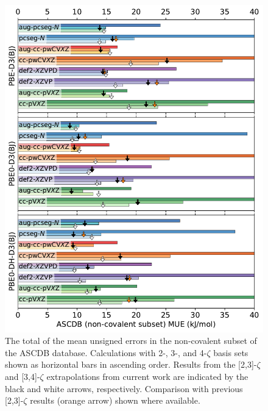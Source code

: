 \documentclass[12pt]{article}
\begin{document}
\clearpage
\begin{figure}[p]
    \centering
    \includegraphics[width=12cm]{../output/fig_ascdb_nc.pdf}
    \caption{The total of the mean unsigned errors in the non-covalent subset of the ASCDB database. Calculations with 2-, 3-, and 4-$\zeta$ basis sets shown as horizontal bars in ascending order. Results from the [2,3]-$\zeta$ and [3,4]-$\zeta$ extrapolations from current work are indicated by the black and white arrows, respectively. Comparison with previous [2,3]-$\zeta$ results (orange arrow) shown where available. \label{fig:ascdb-nc}}
\end{figure}
\end{document}

